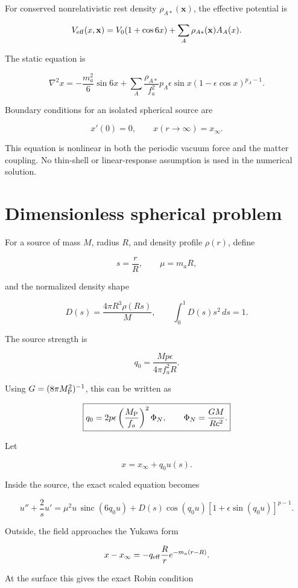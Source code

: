 \documentclass[11pt,a4paper]{article}
\begin{document}
For conserved nonrelativistic rest density \(\rho_{A*}(\mathbf x)\), the
effective potential is

\[
V_{\rm eff}(x,\mathbf x)
=
V_0(1+\cos 6x)
+
\sum_A\rho_{A*}(\mathbf x)A_A(x).
\]

The static equation is

\[
\boxed{
\nabla^2x
=
-\frac{m_a^2}{6}\sin 6x
+
\sum_A\frac{\rho_{A*}}{f_a^2}
 p_A\epsilon\sin x
\left(1-\epsilon\cos x\right)^{p_A-1}.
}
\]

Boundary conditions for an isolated spherical source are

\[
x'(0)=0,
\qquad
x(r\rightarrow\infty)=x_\infty.
\]

This equation is nonlinear in both the periodic vacuum force and the
matter coupling. No thin-shell or linear-response assumption is used in
the numerical solution.



\section{Dimensionless spherical
problem}\label{dimensionless-spherical-problem}

For a source of mass \(M\), radius \(R\), and density profile
\(\rho(r)\), define

\[
s=\frac rR,
\qquad
\mu=m_aR,
\]

and the normalized density shape

\[
D(s)=\frac{4\pi R^3\rho(Rs)}{M},
\qquad
\int_0^1D(s)s^2\,ds=1.
\]

The source strength is

\[
\boxed{
q_0
=
\frac{Mp\epsilon}{4\pi f_a^2R}.
}
\]

Using \(G=(8\pi M_{\rm P}^2)^{-1}\), this can be written as

\[
\boxed{
q_0
=
2p\epsilon
\left(\frac{M_{\rm P}}{f_a}\right)^2
\Phi_N,
\qquad
\Phi_N=\frac{GM}{Rc^2}.
}
\]

Let

\[
x=x_\infty+q_0u(s).
\]

Inside the source, the exact scaled equation becomes

\[
\boxed{
 u''+\frac2s u'
=
\mu^2u\,\operatorname{sinc}(6q_0u)
+
D(s)\cos(q_0u)
\left[1+\epsilon\sin(q_0u)\right]^{p-1}.
}
\]

Outside, the field approaches the Yukawa form

\[
x-x_\infty
=
-q_{\rm eff}\frac{R}{r}e^{-m_a(r-R)}.
\]

At the surface this gives the exact Robin condition
\end{document}

